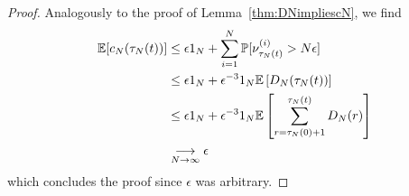 \begin{proof}
Analogously to the proof of Lemma~\ref{thm:DNimpliescN}, we find
\begin{align*}
\mathbb{E}[c_N(\tau_N(t))]
&\leq \epsilon1_N + \sum_{i=1}^N \mathbb{P}[ \nu_{\tau_N(t)}^{(i)} > N\epsilon ] \\
&\leq \epsilon1_N + \epsilon^{-3}1_N \mathbb{E}\left[ D_N(\tau_N(t)) \right] \\
&\leq \epsilon1_N + \epsilon^{-3}1_N
        \mathbb{E}\left[ \sum_{r=\tau_N(0)+1}^{\tau_N(t)} D_N(r) \right] \\
&\underset{N\to\infty}{\longrightarrow} \epsilon
\end{align*}
which concludes the proof since $\epsilon$ was arbitrary.
\end{proof}



